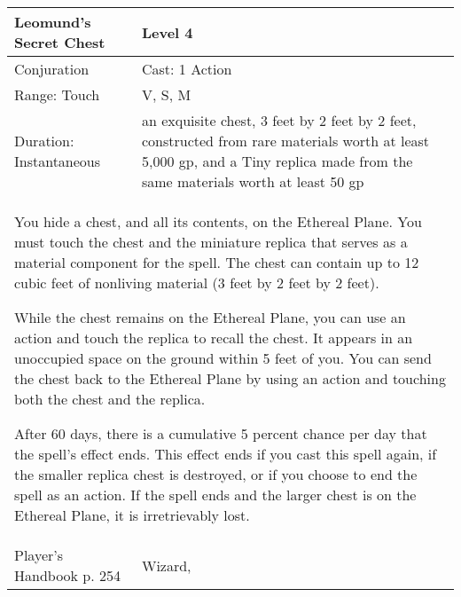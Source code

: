 \documentclass[11pt]{report}
\begin{document}
\begin{table}[H]
	\begin{tabular}{||p{6cm}|p{6cm}||}
		\hline\hline
		\bf{Leomund’s Secret Chest} & Level 4\\ \hline
		Conjuration & Cast: 1 Action\\ \hline
		Range: Touch & V, S, M\\ \hline
		Duration: Instantaneous & an exquisite chest, 3 feet by 2 feet by 2 feet, constructed from rare materials worth at least 5,000 gp, and a Tiny replica made from the same materials worth at least 50 gp\\ \hline
		\multicolumn{2}{||p{12cm}||}{You hide a chest, and all its contents, on the Ethereal Plane.
You must touch the chest and the miniature replica that serves as a material component for the spell. The chest can contain up to 12 cubic feet of nonliving material (3 feet by 2 feet by 2 feet).

While the chest remains on the Ethereal Plane, you can use an action and touch the replica to recall the chest. It appears in an unoccupied space on the ground within 5 feet of you. You can send the chest back to the Ethereal Plane by using an action and touching both the chest and the replica.

After 60 days, there is a cumulative 5 percent chance per day that the spell’s effect ends. This effect ends if you cast this spell again, if the smaller replica chest is destroyed, or if you choose to end the spell as an action. If the spell ends and the larger chest is on the Ethereal Plane, it is irretrievably lost.}\\ \hline
Player's Handbook p. 254 & Wizard, \\ \hline\hline
	\end{tabular}
\end{table}
\end{document}
